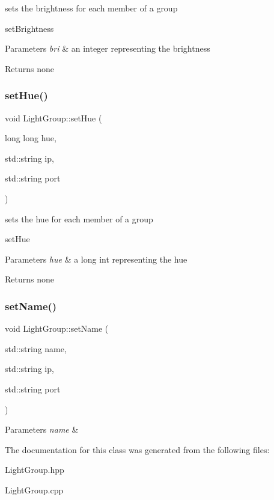 sets the brightness for each member of a group 

set\+Brightness 
\begin{DoxyParams}{Parameters}
{\em bri} & an integer representing the brightness \\
\hline
\end{DoxyParams}
\begin{DoxyReturn}{Returns}
none 
\end{DoxyReturn}
\mbox{\label{class_light_group_a9cf17fe345ba9ca946efdec08cd5dec4}} 
\subsubsection{\texorpdfstring{set\+Hue()}{setHue()}}
{\footnotesize\ttfamily void Light\+Group\+::set\+Hue (\begin{DoxyParamCaption}\item[{long long}]{hue,  }\item[{std\+::string}]{ip,  }\item[{std\+::string}]{port }\end{DoxyParamCaption})}



sets the hue for each member of a group 

set\+Hue 
\begin{DoxyParams}{Parameters}
{\em hue} & a long int representing the hue \\
\hline
\end{DoxyParams}
\begin{DoxyReturn}{Returns}
none 
\end{DoxyReturn}
\mbox{\label{class_light_group_a31d089214736e7c6d9896a4977a9e956}} 
\subsubsection{\texorpdfstring{set\+Name()}{setName()}}
{\footnotesize\ttfamily void Light\+Group\+::set\+Name (\begin{DoxyParamCaption}\item[{std\+::string}]{name,  }\item[{std\+::string}]{ip,  }\item[{std\+::string}]{port }\end{DoxyParamCaption})}


\begin{DoxyParams}{Parameters}
{\em name} & \\
\hline
\end{DoxyParams}


The documentation for this class was generated from the following files\+:\begin{DoxyCompactItemize}
\item 
Light\+Group.\+hpp\item 
Light\+Group.\+cpp\end{DoxyCompactItemize}
